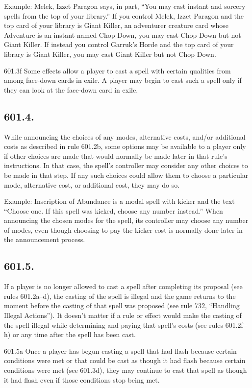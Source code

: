 Example: Melek, Izzet Paragon says, in part, “You may cast instant and sorcery spells from the top of your library.” If you control Melek, Izzet Paragon and the top card of your library is Giant Killer, an adventurer creature card whose Adventure is an instant named Chop Down, you may cast Chop Down but not Giant Killer. If instead you control Garruk’s Horde and the top card of your library is Giant Killer, you may cast Giant Killer but not Chop Down.

601.3f Some effects allow a player to cast a spell with certain qualities from among face-down cards in exile. A player may begin to cast such a spell only if they can look at the face-down card in exile.

\subsection*{601.4.}
While announcing the choices of any modes, alternative costs, and/or additional costs as described in rule 601.2b, some options may be available to a player only if other choices are made that would normally be made later in that rule’s instructions. In that case, the spell’s controller may consider any other choices to be made in that step. If any such choices could allow them to choose a particular mode, alternative cost, or additional cost, they may do so.

Example: Inscription of Abundance is a modal spell with kicker and the text “Choose one. If this spell was kicked, choose any number instead.” When announcing the chosen modes for the spell, its controller may choose any number of modes, even though choosing to pay the kicker cost is normally done later in the announcement process.

\subsection*{601.5.}
If a player is no longer allowed to cast a spell after completing its proposal (see rules 601.2a–d), the casting of the spell is illegal and the game returns to the moment before the casting of that spell was proposed (see rule 732, “Handling Illegal Actions”). It doesn’t matter if a rule or effect would make the casting of the spell illegal while determining and paying that spell’s costs (see rules 601.2f–h) or any time after the spell has been cast.

601.5a Once a player has begun casting a spell that had flash because certain conditions were met or that could be cast as though it had flash because certain conditions were met (see 601.3d), they may continue to cast that spell as though it had flash even if those conditions stop being met.

